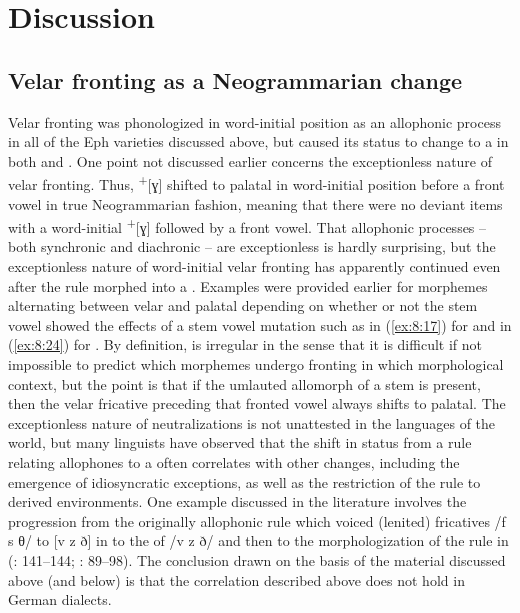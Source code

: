 \section{{Discussion}}\label{sec:8.6}

\subsection{Velar fronting as a Neogrammarian change}\label{sec:8.6.1}

Velar fronting was phonologized in word-initial position as an allophonic process in all of the Eph varieties discussed above, but  caused its status to change to a  in both  and . One point not discussed earlier concerns the exceptionless nature of velar fronting. Thus,  \textsuperscript{+}[ɣ] shifted to palatal in word-initial position before a front vowel in true Neogrammarian fashion, meaning that there were no deviant items with a word-initial \textsuperscript{+}[ɣ] followed by a front vowel. That allophonic processes {}-- both synchronic and diachronic {}-- are exceptionless is hardly surprising, but the exceptionless nature of word-initial velar fronting has apparently continued even after the rule morphed into a . Examples were provided earlier for morphemes alternating between velar and palatal depending on whether or not the stem vowel showed the effects of a stem vowel mutation such as  in (\ref{ex:8:17}) for  and in (\ref{ex:8:24}) for . By definition,  is irregular in the sense that it is difficult if not impossible to predict which morphemes undergo fronting in which morphological context, but the point is that if the umlauted allomorph of a stem is present, then the velar fricative preceding that fronted vowel always shifts to palatal. The exceptionless nature of neutralizations is not unattested in the languages of the world, but many linguists have observed that the shift in status from a rule relating allophones to a  often correlates with other changes, including the emergence of idiosyncratic exceptions, as well as the restriction of the rule to derived environments. One example discussed in the literature involves the progression from the originally allophonic rule which voiced (lenited) fricatives /f s θ/ to [v z ð] in  to the  of /v z ð/ and then to the morphologization of the rule in  (\citealt{RingeEska2013}: 141--144; \citealt{Minkova2014}: 89--98). The conclusion drawn on the basis of the material discussed above (and below) is that the correlation described above does not hold in German dialects.

